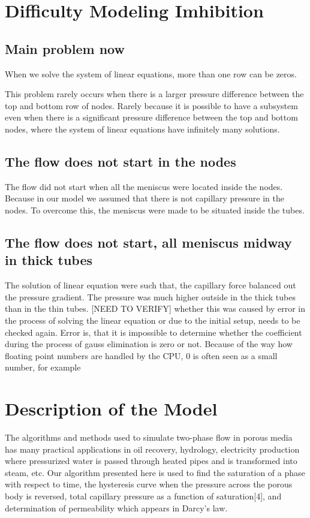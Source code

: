 \section{Difficulty Modeling Imhibition}

\subsection{Main problem now}
When we solve the system of linear equations, more than one row can be zeros.

This problem rarely occurs when there is a larger pressure difference between the top and bottom row of nodes. Rarely because it is possible to have a subsystem even when there is a significant pressure difference between the top and bottom nodes, where the system of linear equations have infinitely many solutions. 


\subsection{The flow does not start in the nodes}

The flow did not start when all the meniscus were located inside the nodes. Because in our model we assumed that there is not capillary pressure in the nodes. To overcome this, the meniscus were made to be situated inside the tubes.

\subsection{The flow does not start, all meniscus midway in thick tubes}

The solution of linear equation were such that, the capillary force balanced out the pressure gradient. The pressure was much higher outside in the thick tubes than in the thin tubes. [NEED TO VERIFY] whether this was caused by error in the process of solving the linear equation or due to the initial setup, needs to be checked again. Error is, that it is impossible to determine whether the coefficient during the process of gauss elimination is zero or not. Because of the way how floating point numbers are handled by the CPU, 0 is often seen as a small number, for example 

\section{Description of the Model}
	The algorithms and methods used to simulate two-phase flow in porous media has many practical applications in oil recovery, hydrology, electricity production where pressurized water is passed through heated pipes and is transformed into steam, etc. Our algorithm presented here is used to find the saturation of a phase with respect to time, the hysteresis curve when the pressure across the porous body is reversed, total capillary pressure as a function of saturation[4], and determination of permeability which appears in Darcy’s law.

